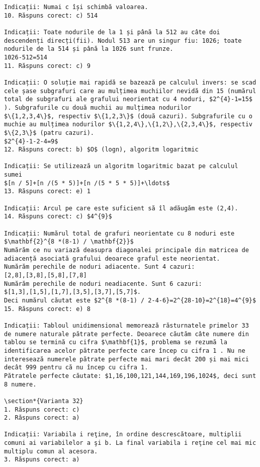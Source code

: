 \begin{verbatim}
Indicații: Numai c își schimbă valoarea.
10. Răspuns corect: c) 514

Indicații: Toate nodurile de la 1 și până la 512 au câte doi descendenți direcți(fii). Nodul 513 are un singur fiu: 1026; toate nodurile de la 514 și până la 1026 sunt frunze.
1026-512=514
11. Răspuns corect: c) 9

Indicații: O soluție mai rapidă se bazează pe calculul invers: se scad cele șase subgrafuri care au mulțimea muchiilor nevidă din 15 (numărul total de subgrafuri ale grafului neorientat cu 4 noduri, $2^{4}-1=15$ ). Subgrafurile cu două muchii au mulțimea nodurilor
$\{1,2,3,4\}$, respectiv $\{1,2,3\}$ (două cazuri). Subgrafurile cu o muchie au mulțimea nodurilor $\{1,2,4\},\{1,2\},\{2,3,4\}$, respectiv $\{2,3\}$ (patru cazuri).
$2^{4}-1-2-4=9$
12. Răspuns corect: b) $O$ (logn), algoritm logaritmic

Indicații: Se utilizează un algoritm logaritmic bazat pe calculul sumei
$[n / 5]+[n /(5 * 5)]+[n /(5 * 5 * 5)]+\ldots$
13. Răspuns corect: e) 1

Indicații: Arcul pe care este suficient să îl adăugăm este (2,4).
14. Răspuns corect: c) $4^{9}$

Indicații: Numărul total de grafuri neorientate cu 8 noduri este $\mathbf{2}^{8 *(8-1) / \mathbf{2}}$
Numărăm ce nu variază deasupra diagonalei principale din matricea de adiacență asociată grafului deoarece graful este neorientat.
Numărăm perechile de noduri adiacente. Sunt 4 cazuri:
[2,8],[3,8],[5,8],[7,8]
Numărăm perechile de noduri neadiacente. Sunt 6 cazuri:
$[1,3],[1,5],[1,7],[3,5],[3,7],[5,7]$.
Deci numărul căutat este $2^{8 *(8-1) / 2-4-6}=2^{28-10}=2^{18}=4^{9}$
15. Răspuns corect: e) 8

Indicații: Tabloul unidimensional memorează răsturnatele primelor 33 de numere naturale pătrate perfecte. Deoarece căutăm câte numere din tablou se termină cu cifra $\mathbf{1}$, problema se rezumă la identificarea acelor pătrate perfecte care încep cu cifra 1 . Nu ne interesează numerele pătrate perfecte mai mari decât 200 și mai mici decât 999 pentru că nu încep cu cifra 1.
Pătratele perfecte căutate: $1,16,100,121,144,169,196,1024$, deci sunt 8 numere.

\section*{Varianta 32}
1. Răspuns corect: c)
2. Răspuns corect: a)

Indicații: Variabila i reţine, în ordine descrescătoare, multiplii comuni ai variabilelor a şi b. La final variabila i reţine cel mai mic multiplu comun al acesora.
3. Răspuns corect: a)


\end{verbatim}
